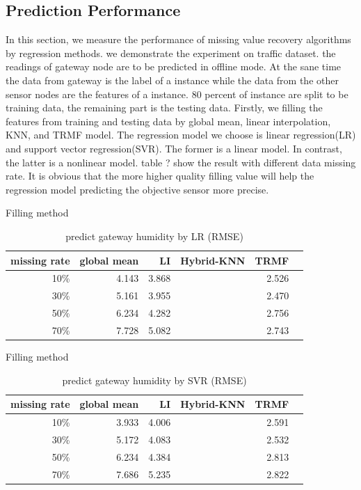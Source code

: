 \subsection{Prediction Performance}
In this section, we measure the performance of missing value recovery algorithms by regression methods. we demonstrate the experiment on traffic dataset.  the readings of gateway node are to be predicted in offline mode. At the sane time the data from gateway is the label of a instance while the data from the other sensor nodes are the features of a instance. 80 percent of instance are split to be training data, the remaining part is the testing data. Firstly, we filling the features from training and testing data by global mean, linear interpolation, KNN, and TRMF model. The regression model we choose is linear regression(LR) and support vector regression(SVR). The former is a linear model. In contrast, the latter is a nonlinear model. table ? show the result with different data missing rate.
It is obvious that the more higher quality filling value will help the regression model predicting the objective sensor more precise.

\begin{table} [htbp]
\centering
\caption{predict gateway humidity by LR (RMSE) }
\label{table: LR}
   Filling method
\begin{tabular}{ r | r r r r r}
        missing rate&global mean     &LI   &Hybrid-KNN &TRMF\\ \hline
        10\%    &4.143&3.868&&2.526\\
        30\%    &5.161&3.955&&2.470\\
        50\%    &6.234&4.282&&2.756\\
        70\%   &7.728&5.082&&2.743\\
  
\end{tabular}
\end{table}

\begin{table} [htbp]
\centering
\caption{predict gateway humidity by SVR (RMSE) }
\label{table: SVR}
   Filling method
\begin{tabular}{ r | r r r r r}
        missing rate&global mean     &LI   &Hybrid-KNN &TRMF\\ \hline
        10\%    &3.933 &4.006&&2.591\\
        30\%    &5.172&4.083&&2.532\\
        50\%    &6.234&4.384&&2.813\\
        70\%   &7.686&5.235&&2.822\\
  
\end{tabular}
\end{table}
